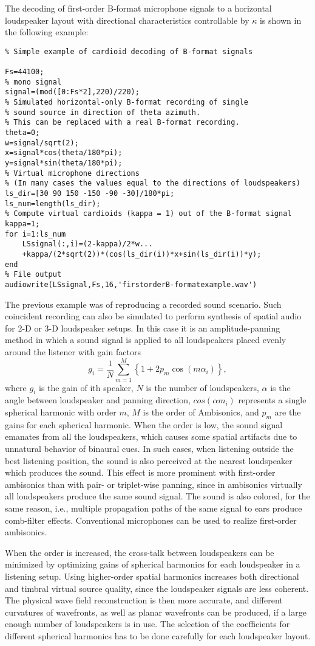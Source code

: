 \documentclass[10pt,a4paper,oneside]{article}
\begin{document}
The decoding of first-order B-format microphone signals to a horizontal loudspeaker layout with directional characteristics controllable by $\kappa$ is shown in the following example:
\begin{lstlisting}
% Simple example of cardioid decoding of B-format signals

Fs=44100;
% mono signal
signal=(mod([0:Fs*2],220)/220); 
% Simulated horizontal-only B-format recording of single 
% sound source in direction of theta azimuth.
% This can be replaced with a real B-format recording. 
theta=0;
w=signal/sqrt(2);
x=signal*cos(theta/180*pi);
y=signal*sin(theta/180*pi);
% Virtual microphone directions 
% (In many cases the values equal to the directions of loudspeakers)
ls_dir=[30 90 150 -150 -90 -30]/180*pi; 
ls_num=length(ls_dir);
% Compute virtual cardioids (kappa = 1) out of the B-format signal
kappa=1;
for i=1:ls_num
	LSsignal(:,i)=(2-kappa)/2*w...
	+kappa/(2*sqrt(2))*(cos(ls_dir(i))*x+sin(ls_dir(i))*y);
end
% File output
audiowrite(LSsignal,Fs,16,'firstorderB-formatexample.wav')
\end{lstlisting}
The previous example was of reproducing a recorded sound scenario. Such coincident recording can also be simulated to perform synthesis of spatial audio for 2-D or 3-D loudspeaker setups. In this case it is an amplitude-panning method in which a sound signal is applied to all loudspeakers placed evenly around the listener with gain factors
\[
g_{i}=\frac{1}{N} \sum_{m=1}^{M}\left\{1+2 p_{m} \cos \left(m \alpha_{i}\right)\right\},
\]
where $g_i$ is the gain of ith speaker, $N$ is the number of loudspeakers, $\alpha$ is the angle between loudspeaker and panning direction, $cos (\alpha m_i)$ represents a single spherical harmonic with order $m$, $M$ is the order of Ambisonics, and $p_m$ are the gains for each spherical harmonic. When the order is low, the sound signal emanates from all the loudspeakers, which causes some spatial artifacts due to unnatural behavior of binaural cues. In such cases, when listening outside the best listening position, the sound is also perceived at the nearest loudspeaker which produces the sound. This effect is more prominent with first-order ambisonics than with pair- or triplet-wise panning, since in ambisonics virtually all loudspeakers produce the same sound signal. The sound is also colored, for the same reason, i.e., multiple propagation paths of the same signal to ears produce comb-filter effects. Conventional microphones can be used to realize first-order ambisonics.

When the order is increased, the cross-talk between loudspeakers can be minimized by optimizing gains of spherical harmonics for each loudspeaker in a listening setup. Using higher-order spatial harmonics increases both directional and timbral virtual source quality, since the loudspeaker signals are less coherent. The physical wave field reconstruction is then more accurate, and different curvatures of wavefronts, as well as planar wavefronts can be produced, if a large enough number of loudspeakers is in use. The selection of the coefficients for different spherical harmonics has to be done carefully for each loudspeaker layout.
\end{document}

